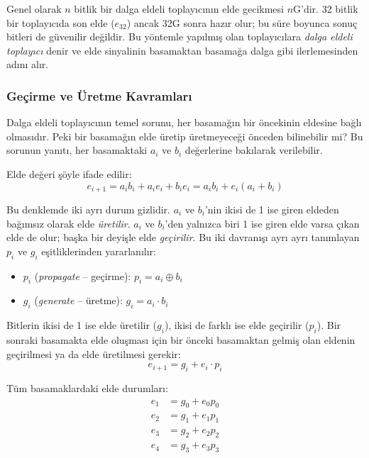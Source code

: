 Genel olarak $n$ bitlik bir dalga eldeli toplayıcının elde gecikmesi $n$G'dir. 32 bitlik bir toplayıcıda son elde ($e_{32}$) ancak 32G sonra hazır olur; bu süre boyunca sonuç bitleri de güvenilir değildir. Bu yöntemle yapılmış olan toplayıcılara \emph{dalga eldeli toplayıcı} denir ve elde sinyalinin basamaktan basamağa dalga gibi ilerlemesinden adını alır.

\subsubsection*{Geçirme ve Üretme Kavramları}
Dalga eldeli toplayıcının temel sorunu, her basamağın bir öncekinin eldesine bağlı olmasıdır. Peki bir basamağın elde üretip üretmeyeceği önceden bilinebilir mi? Bu sorunun yanıtı, her basamaktaki $a_i$ ve $b_i$ değerlerine bakılarak verilebilir.

Elde değeri şöyle ifade edilir:
\begin{equation}
e_{i+1} = a_i b_i + a_i e_i + b_i e_i = a_i b_i + e_i(a_i + b_i)
\label{eq:elde}
\end{equation}

Bu denklemde iki ayrı durum gizlidir. $a_i$ ve $b_i$'nin ikisi de 1 ise giren eldeden bağımsız olarak elde \emph{üretilir}. $a_i$ ve $b_i$'den yalnızca biri 1 ise giren elde varsa çıkan elde de olur; başka bir deyişle elde \emph{geçirilir}. Bu iki davranışı ayrı ayrı tanımlayan $p_i$ ve $g_i$ eşitliklerinden yararlanılır:
\begin{itemize}
\item $p_i$ (\emph{propagate} -- geçirme): $p_i = a_i \oplus b_i$
\item $g_i$ (\emph{generate} -- üretme): $g_i = a_i \cdot b_i$
\end{itemize}

Bitlerin ikisi de 1 ise elde üretilir ($g_i$), ikisi de farklı ise elde geçirilir ($p_i$). Bir sonraki basamakta elde oluşması için bir önceki basamaktan gelmiş olan eldenin geçirilmesi ya da elde üretilmesi gerekir:
\begin{equation}
e_{i+1} = g_i + e_i \cdot p_i
\end{equation}

Tüm basamaklardaki elde durumları:
\begin{align}
e_1 &= g_0 + e_0 p_0 \label{eq:c1} \\
e_2 &= g_1 + e_1 p_1 \label{eq:c2} \\
e_3 &= g_2 + e_2 p_2 \label{eq:c3} \\
e_4 &= g_3 + e_3 p_3 \label{eq:c4}
\end{align}

